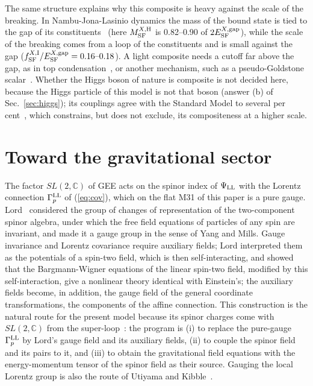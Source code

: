 \documentclass[aps,prd,twocolumn,superscriptaddress,nofootinbib,floatfix,longbibliography]{revtex4-2}
\newcommand{\LL}{{\rm LL}}
\newcommand{\SF}{{\rm SF}}
\begin{document}
The same structure explains why this composite is heavy against the scale of the breaking. In Nambu-Jona-Lasinio
dynamics the mass of the bound state is tied to the gap of its constituents~\cite{NJL1961} (here $M^{X,{\rm H}}_\SF$ is
0.82\mbox{--}0.90 of $2E^{X,{\rm gap}}_\SF$), while the scale of the breaking comes from a loop of the constituents and is small
against the gap ($f^{X,{\rm I}}_\SF/E^{X,{\rm gap}}_\SF=0.16\mbox{--}0.18$). A light composite needs a cutoff far above the gap, as
in top condensation~\cite{BHL1990,HillSimmons2003}, or another mechanism, such as a pseudo-Goldstone
scalar~\cite{KaplanGeorgi1984,Agashe2005}. Whether the Higgs boson of nature is composite is not decided here, because the
Higgs particle of this model is not that boson (answer (b) of Sec.~\ref{sec:higgs}); its couplings agree with the Standard
Model to several per cent~\cite{ATLAS2022,CMS2022}, which constrains, but does not exclude, its compositeness at a higher
scale.

\section{Toward the gravitational sector}
\label{sec:gravity}

The factor $SL(2,\mathbb C)$ of GEE acts on the spinor index of $\Psi_\LL$ with the Lorentz connection $\Gamma^\LL_p$ of
(\ref{eq:cov}), which on the flat M31 of this paper is a pure gauge. Lord~\cite{Lord1971} considered the group of changes of
representation of the two-component spinor algebra, under which the free field equations of particles of any spin are
invariant, and made it a gauge group in the sense of Yang and Mills. Gauge invariance and Lorentz covariance require
auxiliary fields; Lord interpreted them as the potentials of a spin-two field, which is then self-interacting, and showed
that the Bargmann-Wigner equations of the linear spin-two field, modified by this self-interaction, give a nonlinear theory
identical with Einstein's; the auxiliary fields become, in addition, the gauge field of the general coordinate
transformations, the components of the affine connection. This construction is the natural route for the present model
because its spinor charges come with $SL(2,\mathbb C)$ from the super-loop~\cite{Nash2026}: the program is (i) to replace the
pure-gauge $\Gamma^\LL_p$ by Lord's gauge field and its auxiliary fields, (ii) to couple the spinor field and its pairs to
it, and (iii) to obtain the gravitational field equations with the energy-momentum tensor of the spinor field as their
source. Gauging the local Lorentz group is also the route of Utiyama and Kibble~\cite{Utiyama1956,Kibble1961,Hehl1976}.
\end{document}
